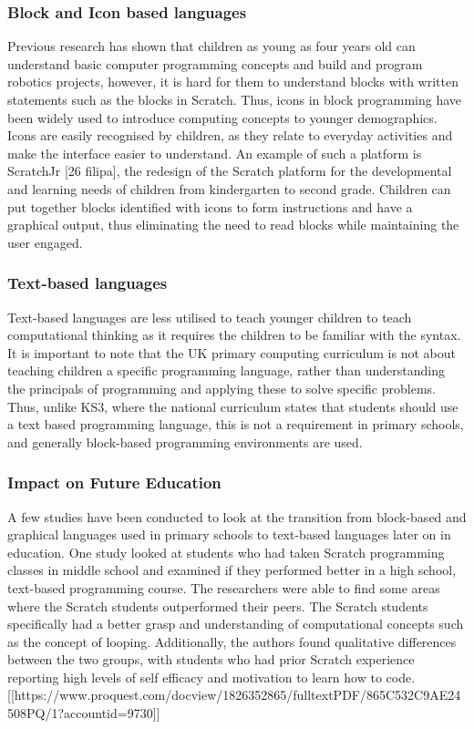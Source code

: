 \documentclass[oneside,%
                    author={Malak Hajji},
                    degree={BSc},
                    title={Designing An Accessible Computational Toolkit For Students},
                  subtitle={With Mixed Visual Abilities}]{dissertation}
\begin{document}
\subsubsection{Block and Icon based languages}
Previous research has shown that children as young as four years old can understand basic computer programming concepts and build and program robotics projects, however, it is hard for them to understand blocks with written statements such as the blocks in Scratch. Thus, icons in block programming have been widely used to introduce computing concepts to younger demographics. Icons are easily recognised by children, as they relate to everyday activities and make the interface easier to understand.
An example of such a platform is ScratchJr [26 filipa], the redesign of the Scratch platform for the developmental and learning needs of children from kindergarten to second grade. Children can put together blocks identified with icons to form instructions and have a graphical output, thus eliminating the need to read blocks while maintaining the user engaged.

\subsubsection{Text-based languages}

Text-based languages are less utilised to teach younger children to teach computational thinking as it requires the children to be familiar with the syntax. It is important to note that the UK primary computing curriculum is not about teaching children a specific programming language, rather than understanding the principals of programming and applying these to solve specific problems. Thus, unlike KS3, where the national curriculum states that students should use a text based programming language, this is not a requirement in primary schools, and generally block-based programming environments are used.

\subsubsection{Impact on Future Education }

A few studies have been conducted to look at the transition from block-based and graphical languages used in primary schools to text-based languages later on in education. One study looked at students who had taken Scratch programming classes in middle school and examined if they performed better in a high school, text-based programming course. The researchers were able to find some areas where the Scratch students outperformed their peers. The Scratch students specifically had a better grasp and understanding of computational concepts such as the concept of looping. Additionally, the authors found qualitative differences between the two groups, with students who had prior Scratch experience reporting high levels of self efficacy and motivation to learn how to code. [[https://www.proquest.com/docview/1826352865/fulltextPDF/865C532C9AE24508PQ/1?accountid=9730]]
\end{document}
